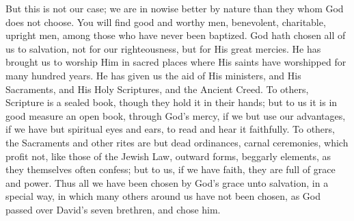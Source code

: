 But this is not our case; we are in nowise better by nature than they
whom God does not choose. You will find good and worthy men,
benevolent, charitable, upright men, among those who have never been
baptized. God hath chosen all of us to salvation, not for our
righteousness, but for His great mercies. He has brought us to worship
Him in sacred places where His saints have worshipped for many hundred
years. He has given us the aid of His ministers, and His Sacraments,
and His Holy Scriptures, and the Ancient Creed. To others, Scripture
is a sealed book, though they hold it in their hands; but to us it is
in good measure an open book, through God's mercy, if we but use our
advantages, if we have but spiritual eyes and ears, to read and hear
it faithfully. To others, the Sacraments and other rites are but dead
ordinances, carnal ceremonies, which profit not, like those of the
Jewish Law, outward forms, beggarly elements, as they themselves often
confess; but to us, if we have faith, they are full of grace and
power. Thus all we have been chosen by God's grace unto salvation, in
a special way, in which many others around us have not been chosen, as
God passed over David's seven brethren, and chose him.

